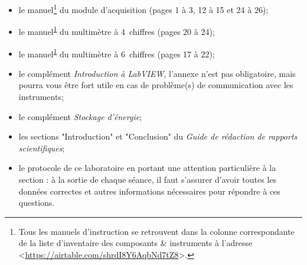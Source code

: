 \documentclass[canadien,12pt,oneside,letterpaper]{article}
\renewcommand\footnotemark{}
\begin{document}
\begin{itemize} \itemsep3pt
\item le manuel\footnote{\label{airtable}Tous les manuels d'instruction se retrouvent dans la colonne correspondante de la liste d'inventaire des composants \& instruments à l'adresse <\url{https://airtable.com/shrdI8Y6AqbNd7tZ8}>.} du module d'acquisition (pages 1 à 3, 12 à 15 et 24 à 26);
\item le manuel\textsuperscript{\footnotemark\ref{airtable}} du multimètre à 4\textonehalf~chiffres (pages 20 à 24); 
\item le manuel\textsuperscript{\footnotemark\ref{airtable}} du multimètre à 6\textonehalf~chiffres (pages 17 à 22);
\item le complément \textit{Introduction à LabVIEW}, l'annexe n'est pas obligatoire, mais pourra vous être fort utile en cas de problème(s) de communication avec les instruments;
\item le complément \textit{Stockage d’énergie};
\item les sections "Introduction" et "Conclusion" du \textit{Guide de rédaction de rapports scientifiques};
\item le protocole de ce laboratoire en portant une attention particulière à la section : à la sortie de chaque séance, il faut s'assurer d'avoir toutes les données correctes et autres informations nécessaires pour répondre à ces questions.
\end{itemize}
\vspace{1ex}
\noindent{}


\end{document}
